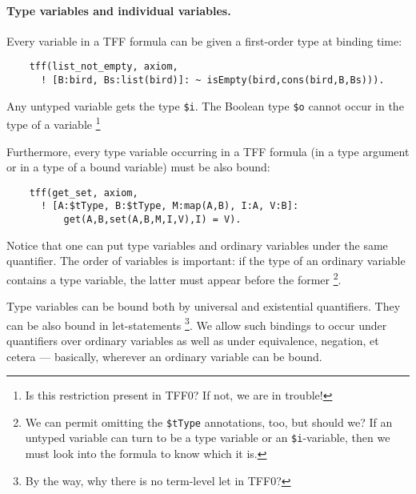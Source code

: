 \paragraph{Type variables and individual variables.}
Every variable in a TFF formula can be given a first-order type
at binding time:
\begin{verbatim}
    tff(list_not_empty, axiom,
      ! [B:bird, Bs:list(bird)]: ~ isEmpty(bird,cons(bird,B,Bs))).
\end{verbatim}
Any untyped variable gets the type \verb+$i+. The Boolean type
\verb+$o+ cannot occur in the type of a variable%
\footnote{Is this restriction present in TFF0?
If not, we are in trouble!}

Furthermore, every type variable occurring in a TFF formula
(in a type argument or in a type of a bound variable)
must be also bound:
\begin{verbatim}
    tff(get_set, axiom,
      ! [A:$tType, B:$tType, M:map(A,B), I:A, V:B]:
          get(A,B,set(A,B,M,I,V),I) = V).
\end{verbatim}
Notice that one can put type variables and ordinary variables
under the same quantifier. The order of variables is important:
if the type of an ordinary variable contains a type variable,
the latter must appear before the former%
\footnote{We can permit omitting the {\tt\$tType} annotations,
too, but should we? If an untyped variable can turn to be
a type variable or an {\tt\$i}-variable, then we must look
into the formula to know which it is.}.

Type variables can be bound both by universal and existential
quantifiers. They can be also bound in let-statements%
\footnote{By the way, why there is no term-level let in TFF0?}.
We allow such bindings to occur under quantifiers over ordinary
variables as well as under equivalence, negation, et cetera ---
basically, wherever an ordinary variable can be bound.


